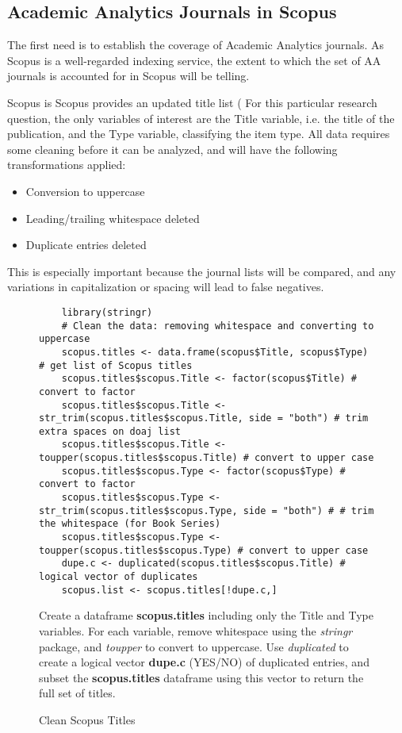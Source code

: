 \documentclass{article}
\begin{document}
\subsection{Academic Analytics Journals in Scopus}
The first need is to establish the coverage of Academic Analytics journals.
As Scopus is a well-regarded indexing service, the extent to which the set of AA journals is accounted for in Scopus will be telling.

Scopus is %
Scopus provides an updated title list (%
For this particular research question, the only variables of interest are the Title variable, i.e. the title of the publication, and the Type variable, classifying the item type.
All data requires some cleaning before it can be analyzed, and will have the following transformations applied:
\begin{itemize}
	\item Conversion to uppercase
	\item Leading/trailing whitespace deleted
	\item Duplicate entries deleted
\end{itemize}
This is especially important because the journal lists will be compared, and any variations in capitalization or spacing will lead to false negatives.
\begin{figure}[ht]
	\centering
	\begin{lstlisting}
	library(stringr)
	# Clean the data: removing whitespace and converting to uppercase
	scopus.titles <- data.frame(scopus$Title, scopus$Type) # get list of Scopus titles
	scopus.titles$scopus.Title <- factor(scopus$Title) # convert to factor
	scopus.titles$scopus.Title <- str_trim(scopus.titles$scopus.Title, side = "both") # trim extra spaces on doaj list
	scopus.titles$scopus.Title <- toupper(scopus.titles$scopus.Title) # convert to upper case
	scopus.titles$scopus.Type <- factor(scopus$Type) # convert to factor
	scopus.titles$scopus.Type <- str_trim(scopus.titles$scopus.Type, side = "both") # # trim the whitespace (for Book Series)
	scopus.titles$scopus.Type <- toupper(scopus.titles$scopus.Type) # convert to upper case
	dupe.c <- duplicated(scopus.titles$scopus.Title) # logical vector of duplicates
	scopus.list <- scopus.titles[!dupe.c,]
	\end{lstlisting}
	\footnotesize{
		Create a dataframe \textbf{scopus.titles} including only the Title and Type variables.
		For each variable, remove whitespace using the \textit{stringr} package, and \textit{toupper} to convert to uppercase.
		Use \textit{duplicated} to create a logical vector \textbf{dupe.c} (YES/NO) of duplicated entries, and subset the \textbf{scopus.titles} dataframe using this vector to return the full set of titles.
			}
	\caption{Clean Scopus Titles}
\end{figure}
\end{document}
